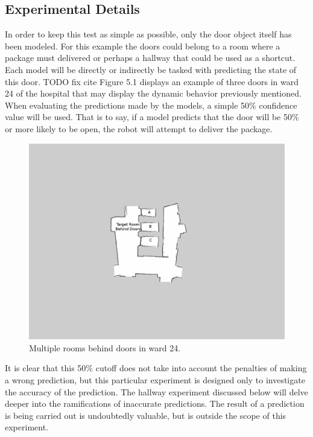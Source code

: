   \subsection{ Experimental Details }

  In order to keep this test as simple as possible, only the door
  object itself has been modeled. For this example the doors could belong to a room where a
  package must delivered or perhaps a hallway that could be used as a
  shortcut. Each model will be directly or indirectly be tasked with
  predicting the state of this door. TODO fix cite Figure 5.1 displays an example of three
  doors in ward 24 of the hospital that may display the dynamic behavior
  previously mentioned. \\

  When evaluating the predictions made by the models, a simple 50\% confidence
  value will be used. That is to say, if a model predicts that the door will
  be 50\% or more likely to be open, the robot will attempt to
  deliver the package. \\

  \begin{figure}[!htb]
    \centering
    \includegraphics[width=\linewidth]{images/ward_24_door.png}
    \caption{Multiple rooms behind doors in ward 24.}
    \label{figure:ward_24_door}
  \end{figure}

  It is clear that this 50\% cutoff does not take into account the penalties
  of making a wrong prediction, but this particular experiment is designed only to
  investigate the accuracy of the prediction. The hallway experiment discussed
  below will delve deeper into the ramifications of inaccurate
  predictions. The result of a prediction is
  being carried out is undoubtedly valuable, but is outside the scope of this
  experiment. \\

